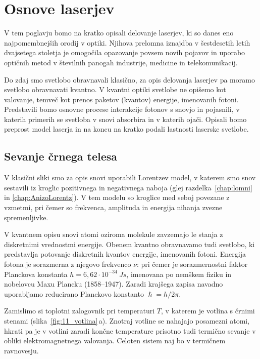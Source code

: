 
\chapter{Osnove laserjev}
V tem poglavju bomo na kratko opisali delovanje laserjev, ki so 
danes eno najpomembnejših orodij v optiki. Njihova prelomna
iznajdba v šestdesetih letih dvajsetega stoletja je omogočila
opazovanje povsem novih pojavov in uporabo optičnih metod
v številnih panogah industrije, medicine in telekomunikacij.

Do zdaj smo svetlobo obravnavali klasično, za
opis delovanja laserjev pa moramo svetlobo obravnavati kvantno. V kvantni optiki 
svetlobe ne opišemo kot valovanje, temveč kot 
prenos paketov (kvantov) energije, imenovanih fotoni. 
Predstavili bomo osnovne procese interakcije 
fotonov s snovjo in pojasnili, v katerih primerih se svetloba v snovi
absorbira in v katerih ojači. Opisali bomo preprost model laserja 
in na koncu na kratko podali lastnosti laserske svetlobe.

\section{Sevanje črnega telesa}
V klasični sliki smo za opis snovi uporabili Lorentzev model, 
v katerem smo snov sestavili iz kroglic pozitivnega in 
negativnega naboja (glej razdelka~\ref{chap:lomni} in 
\ref{chap:AnizoLorentz}).
V tem modelu so kroglice med seboj povezane z vzmetmi, pri čemer so
frekvenca, amplituda in energija nihanja zvezne spremenljivke.

V kvantnem opisu snovi atomi oziroma molekule zavzemajo
le stanja z diskretnimi vrednostmi energije. Obenem kvantno
obravnavamo tudi svetlobo, ki predstavlja potovanje diskretnih
kvantov energije, imenovanih fotoni. 
Energija fotona je sorazmerna z njegovo frekvenco $\nu$:
pri čemer je sorazmernostni faktor Planckova konstanta
$h = 6,62 \cdot 10^{-34}~\si{Js}$, imenovana 
po nemškem fiziku in nobelovcu Maxu Plancku (1858--1947).
Zaradi krajšega zapisa navadno uporabljamo reducirano Planckovo konstanto
$\hslash = h/2\pi$.

Zamislimo si toplotni zalogovnik pri temperaturi $T$, v katerem 
je votlina s črnimi stenami (slika~\ref{fig:11_votlina}\,a). 
Znotraj votline se nahajajo posamezni atomi, hkrati pa je v votlini zaradi 
končne temperature prisotno tudi termično sevanje v obliki 
elektromagnetnega valovanja. Celoten sistem naj bo v termičnem ravnovesju.


